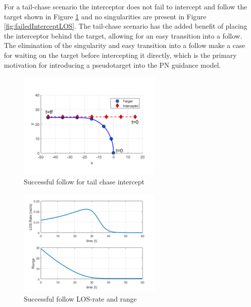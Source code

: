 \documentclass[conference]{IEEEtran}
\begin{document}
For a tail-chase scenario the interceptor does not fail to intercept and follow the target shown in Figure \ref{fig:successfulFollow} and no singularities are present in Figure \ref{fig:failedInterceptLOS}. The tail-chase scenario has the added benefit of placing the interceptor behind the target, allowing for an easy transition into a follow. The elimination of the singularity and easy transition into a follow make a case for waiting on the target before intercepting it directly, which is the primary motivation for introducing a pseudotarget into the PN guidance model.

\begin{figure}[H]
	\centering
	\includegraphics[width=7cm] {x15}
	\caption{Successful follow for tail chase intercept}
	\label{fig:successfulFollow}
	\hspace*{0mm}
\end{figure}

\begin{figure}[H]
	\centering
	\includegraphics[width=7cm] {x15_range_LOSrate}
	\caption{Successful follow LOS-rate and range}
	\label{fig:successfulFollowLOS}
		\hspace*{0mm}
\end{figure}

\end{document}

